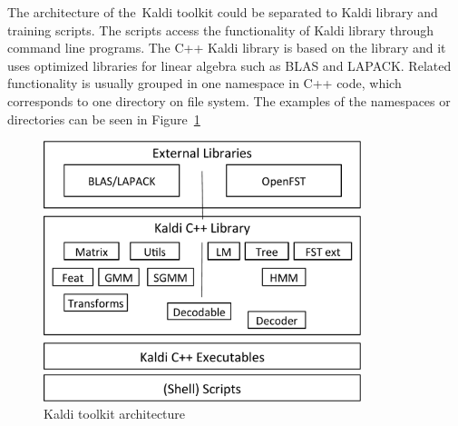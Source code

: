 The architecture of the~Kaldi toolkit could be separated to Kaldi library and training scripts.
The scripts access the functionality of Kaldi library through command line programs.
The C++ Kaldi library is based on the \cite{allauzen2007openfst} library and it uses optimized libraries for linear algebra such as BLAS and LAPACK.
Related functionality is usually grouped in one namespace in C++ code, which corresponds to one directory on file system. 
The examples of the namespaces or directories can be seen in Figure~\ref{fig:kaldi_arch}

\begin{figure}[!htp]
    \begin{center}
        \includegraphics[width=25em]{images/kaldi-lib}
        \caption{Kaldi toolkit architecture\cite{povey2011kaldi}}
        \label{fig:kaldi_arch} 
    \end{center}
\end{figure}

